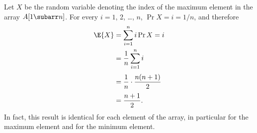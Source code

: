 Let $X$ be the random variable denoting the index of the maximum element in the array $A[1\subarr n]$.
For every $i=1$, 2, \dots, $n$, $\Pr{X=i}=1/n$, and therefore
\begin{align*}
    \E{X} &= \sum_{i=1}^ni\Pr{X=i} \\
    &= \frac{1}{n}\sum_{i=1}^ni \\[1mm]
    &= \frac{1}{n}\cdot\frac{n(n+1)}{2} \\[1mm]
    &= \frac{n+1}{2}.
\end{align*}
In fact, this result is identical for each element of the array, in particular for the maximum element and for the minimum element.
